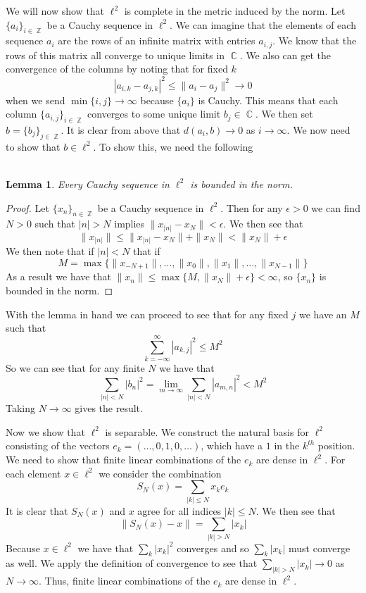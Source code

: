 \documentclass{article}
\DeclareMathOperator{\Z}{\mathbb{Z}}
\DeclareMathOperator{\C}{\mathbb{C}}
\newcommand{\norm}[1]{\|#1\|}
\newtheorem*{lem}{\\ Lemma}
\begin{document}
We will now show that $\ell^2$ is complete in the metric induced by the norm. Let $\{a_i\}_{i\in \Z}$ be a Cauchy sequence in $\ell^2$. We can imagine that the elements of each sequence $a_i$ are the rows of an infinite matrix with entries $a_{i,j}$. We know that the rows of this matrix all converge to unique limits in $\C$. We also can get the convergence of the columns by noting that for fixed $k$
\[
|a_{i,k} - a_{j,k}|^2 \leq \norm{a_i - a_j}^2 \to 0
\]
when we send $\min\{i,j\} \to \infty$ because $\{a_i\}$ is Cauchy. This means that each column $\{a_{i,j}\}_{i \in \Z}$ converges to some unique limit $b_j \in \C$. We then set $b = \{b_j\}_{j\in \Z}$. It is clear from above that $d(a_i, b) \to 0$ as $i \to \infty$. We now need to show that $b \in \ell^2$. To show this, we need the following 
\begin{lem}
Every Cauchy sequence in $\ell^2$ is bounded in the norm.
\end{lem} 
\begin{proof}
Let $\{x_n\}_{n\in \Z}$ be a Cauchy sequence in $\ell^2$. Then for any $\epsilon > 0$ we can find $N > 0$ such that $|n| > N$ implies $\norm{x_{|n|} - x_N} < \epsilon$. We then see that 
\[
\norm{x_{|n|}} \leq \norm{x_{|n|} - x_N} + \norm{x_N} < \norm{x_N} + \epsilon
\]
We then note that if $|n| < N$ that if 
\[
M = \max\{\norm{x_{-N + 1}}, \ldots, \norm{x_0}, \norm{x_1}, \ldots, \norm{x_{N - 1}}\}
\]
As a result we have that $\norm{x_n} \leq \max\{M, \norm{x_N} + \epsilon\} < \infty$, so $\{x_n\}$ is bounded in the norm. 
\end{proof}

With the lemma in hand we can proceed to see that for any fixed $j$ we have an $M$ such that
\[
\sum_{k = -\infty}^\infty |a_{k,j}|^2 \leq M^2
\]
So we can see that for any finite $N$ we have that
\[
\sum_{|n| < N} |b_{n}|^2 = \lim_{m \to \infty} \sum_{|n| < N} |a_{m,n}|^2 < M^2
\]
Taking $N \to \infty$ gives the result. 

Now we show that $\ell^2$ is separable. We construct the natural basis for $\ell^2$ consisting of the vectors $e_k = (\ldots, 0, 1, 0, \ldots)$, which have a $1$ in the $k^{th}$ position. We need to show that finite linear combinations of the $e_k$ are dense in $\ell^2$. For each element $x \in \ell^2$ we consider the combination
\[
S_N(x) = \sum_{|k| \leq N} x_ke_k
\]
It is clear that $S_N(x)$ and $x$ agree for all indices $|k| \leq N$. We then see that
\[
\norm{S_N(x) - x} = \sum_{|k| > N} |x_k|
\]
Because $x \in \ell^2$ we have that $\sum_k |x_k|^2$ converges and so $\sum_k |x_k|$ must converge as well. We apply the definition of convergence to see that $\sum_{|k| > N} |x_k| \to 0$ as $N \to \infty$. Thus, finite linear combinations of the $e_k$ are dense in $\ell^2$.
\end{document}
